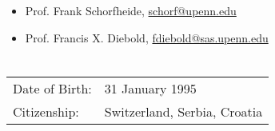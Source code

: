 \documentclass[letter,10pt]{article}
\newcommand{\spacebeforeitems}{\vspace*{8pt}}
\newcommand{\rowspace}{2pt} %
\begin{document}
\spacebeforeitems

\begin{itemize}
	\item Prof. Frank Schorfheide, \href{mailto:schorf@upenn.edu}{schorf@upenn.edu}
	\item Prof. Francis X. Diebold, \href{mailto:fdiebold@sas.upenn.edu}{fdiebold@sas.upenn.edu}
\end{itemize}


\section*{}

\begin{table}[h!]
	\begin{tabular}{p{2.5cm}p{15cm}}
		Date of Birth:	& 31 January 1995 \\[\rowspace]
		Citizenship: 		& Switzerland, Serbia, Croatia \\
	\end{tabular}
\end{table}
\end{document}
